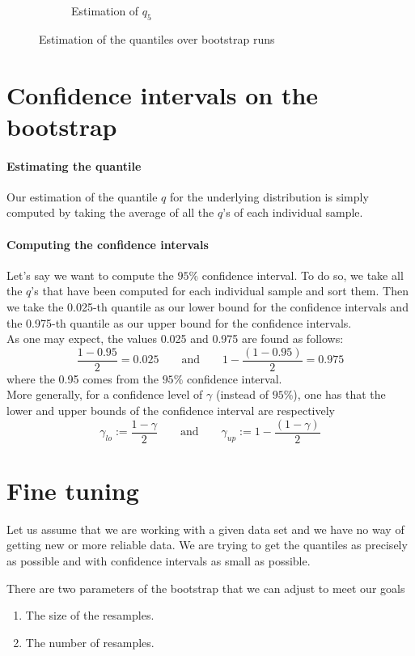 \documentclass{article}
\begin{document}
\begin{figure}
\begin{subfigure}{.84\textwidth}
        \caption{Estimation of $q_5$}
    \end{subfigure}
    \caption{Estimation of the quantiles over bootstrap runs}
    \label{fig: estimation of quantiles}
\end{figure}

\section{Confidence intervals on the bootstrap}
\label{section: confidence intervals on the bootstrap}

\paragraph{Estimating the quantile} Our estimation of the quantile $q$ for the underlying distribution is simply computed by taking the average of all the $q$'s of each individual sample.

\paragraph{Computing the confidence intervals} Let's say we want to compute the $95\%$ confidence interval. To do so, we take all the $q$'s that have been computed for each individual sample and sort them. Then we take the 0.025-th quantile as our lower bound for the confidence intervals and the 0.975-th quantile as our upper bound for the confidence intervals. \\
As one may expect, the values 0.025 and 0.975 are found as follows:
\[
    \frac{1 - 0.95}{2} = 0.025 \qquad \mbox{and} \qquad 1 - \frac{(1 - 0.95)}{2} = 0.975
\]
where the 0.95 comes from the $95\%$ confidence interval. \\
More generally, for a confidence level of $\gamma$ (instead of $95\%$), one has that the lower and upper bounds of the confidence interval are respectively
\[
    \gamma_{lo} := \frac{1 - \gamma}{2} \qquad \mbox{and} \qquad \gamma_{up} := 1 - \frac{(1 - \gamma)}{2}
\]

\section{Fine tuning}
Let us assume that we are working with a given data set and we have no way of getting new or more reliable data. We are trying to get the quantiles as precisely as possible and with confidence intervals as small as possible.

There are two parameters of the bootstrap that we can adjust to meet our goals
\begin{enumerate}
    \item The size of the resamples.
    \item The number of resamples.
\end{enumerate}\
\end{document}
